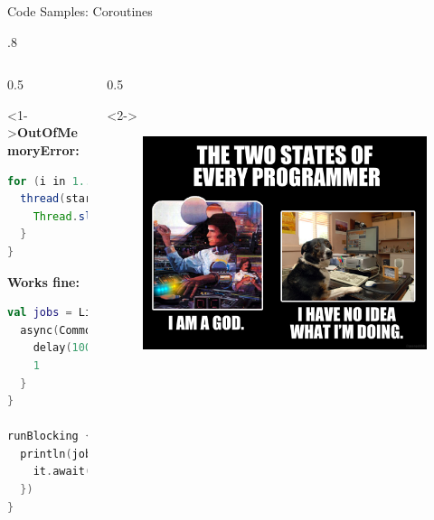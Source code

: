 \begin{frame}[fragile]{Code Samples: Coroutines}
	\begin{overlayarea}{\textwidth}{.8\textheight}
		\begin{columns}
			\begin{column}{0.5\textwidth}
				\begin{onlyenv}<1->\textbf{OutOfMemoryError:}
\begin{lstlisting}[language=java,basicstyle=\ttfamily\scriptsize]
for (i in 1..100_000) {
  thread(start = true) {
    Thread.sleep(1000)
  }
}
\end{lstlisting}
\textbf{Works fine:}
\begin{lstlisting}[language=Kotlin,basicstyle=\ttfamily\scriptsize]
val jobs = List(100_000) {
  async(CommonPool) {
    delay(1000L)
    1
  }
}

runBlocking { // bridge async world
  println(jobs.sumBy {
    it.await()
  })
}
\end{lstlisting}
				\end{onlyenv}
			\end{column}
			\begin{column}{0.5\textwidth}
				\begin{onlyenv}<2->
					\begin{center}
						\begin{figure}
							\includegraphics[width=\textwidth]{figures/twoStatesEveryProgrammer}
						\end{figure}
					\end{center}
				\end{onlyenv}
			\end{column}
		\end{columns}
	\end{overlayarea}
\end{frame}

